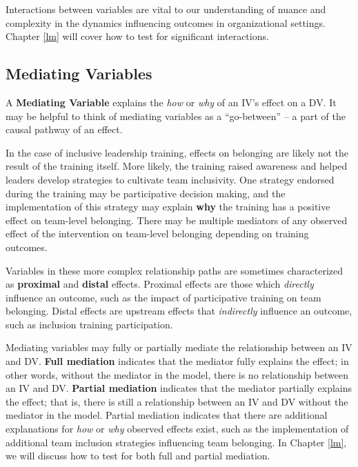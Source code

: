 \documentclass[
]{book}
\begin{document}
Interactions between variables are vital to our understanding of nuance and complexity in the dynamics influencing outcomes in organizational settings. Chapter \ref{lm} will cover how to test for significant interactions.

\hypertarget{mediating-variables}{%
\subsection{Mediating Variables}\label{mediating-variables}}

A \textbf{Mediating Variable} explains the \emph{how} or \emph{why} of an IV's effect on a DV. It may be helpful to think of mediating variables as a ``go-between'' -- a part of the causal pathway of an effect.

In the case of inclusive leadership training, effects on belonging are likely not the result of the training itself. More likely, the training raised awareness and helped leaders develop strategies to cultivate team inclusivity. One strategy endorsed during the training may be participative decision making, and the implementation of this strategy may explain \textbf{why} the training has a positive effect on team-level belonging. There may be multiple mediators of any observed effect of the intervention on team-level belonging depending on training outcomes.

Variables in these more complex relationship paths are sometimes characterized as \textbf{proximal} and \textbf{distal} effects. Proximal effects are those which \emph{directly} influence an outcome, such as the impact of participative training on team belonging. Distal effects are upstream effects that \emph{indirectly} influence an outcome, such as inclusion training participation.

Mediating variables may fully or partially mediate the relationship between an IV and DV. \textbf{Full mediation} indicates that the mediator fully explains the effect; in other words, without the mediator in the model, there is no relationship between an IV and DV. \textbf{Partial mediation} indicates that the mediator partially explains the effect; that is, there is still a relationship between an IV and DV without the mediator in the model. Partial mediation indicates that there are additional explanations for \emph{how} or \emph{why} observed effects exist, such as the implementation of additional team inclusion strategies influencing team belonging. In Chapter \ref{lm}, we will discuss how to test for both full and partial mediation.
\end{document}
